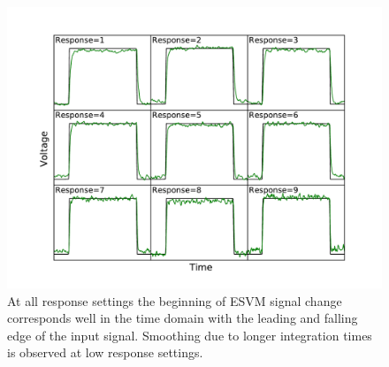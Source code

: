 \begin{figure}
\includegraphics[width=30pc]{chap_electrical/ESVM_Allchan_timing.pdf}
\caption{At all response settings the beginning of ESVM signal change corresponds well in the time domain with the leading and falling edge of the input signal.  Smoothing due to longer integration times is observed at low response settings.}
\label{esvm_timing}
\end{figure}

